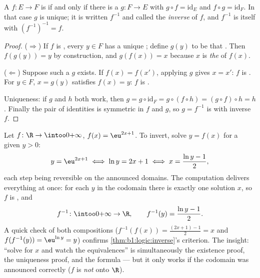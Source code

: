 \begin{theorem}\label{thm:b1:logic:inverse}
A  $f \colon E \to F$ is  if and only if there is a 
$g \colon F \to E$ with $g \circ f = \mathrm{id}_E$ and $f \circ g =
\mathrm{id}_F$. In that case $g$ is unique; it is written $f^{-1}$ and
called the \emph{inverse} of $f$, and $f^{-1}$ is itself  with
$(f^{-1})^{-1} = f$.
\end{theorem}

\begin{proof}
($\Rightarrow$) If $f$ is , every $y \in F$ has a unique
; define $g(y)$ to be that . Then $f(g(y)) = y$ by
construction, and $g(f(x)) = x$ because $x$ is \emph{the}  of
$f(x)$.

($\Leftarrow$) Suppose such a $g$ exists. If $f(x) = f(x')$, applying
$g$ gives $x = x'$: $f$ is . For $y \in F$, $x = g(y)$
satisfies $f(x) = y$: $f$ is .

Uniqueness: if $g$ and $h$ both work, then $g = g \circ \mathrm{id}_F
= g \circ (f \circ h) = (g \circ f) \circ h = h$. Finally the pair of
identities is symmetric in $f$ and $g$, so $g = f^{-1}$ is 
with inverse $f$.
\end{proof}

\begin{example}\label{ex:b1:logic:inversecomp}
Let $f \colon \R \to \intoo0{+\infty}$, $f(x) = \eu^{2x+1}$. To
invert, solve $y = f(x)$ for a given $y > 0$:
\[
y = \eu^{2x+1} \iff \ln y = 2x + 1 \iff x = \frac{\ln y - 1}2 ,
\]
each step being reversible on the announced domains. The
computation delivers everything at once: for each $y$ in the
codomain there is exactly one solution $x$, so $f$ is ,
and
\[
f^{-1} \colon \intoo0{+\infty} \to \R,
\qquad
f^{-1}(y) = \frac{\ln y - 1}2 .
\]
A quick check of both compositions ($f^{-1}(f(x)) = \frac{(2x+1) -
1}2 = x$ and $f(f^{-1}(y)) = \eu^{\ln y} = y$) confirms
\cref{thm:b1:logic:inverse}'s criterion. The insight: ``solve for
$x$ and watch the equivalences'' is simultaneously the existence
proof, the uniqueness proof, and the formula --- but it only works
if the codomain was announced correctly ($f$ is \emph{not}
 onto $\R$).
\end{example}

